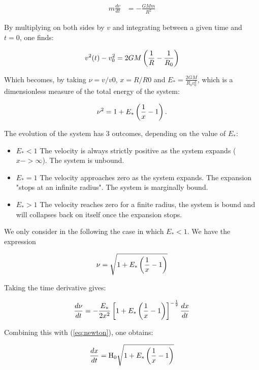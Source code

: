 \begin{align}\label{eq:newton}
m \frac{dv}{dt} & = - \frac{G M m}{R^2}
\end{align}

By multiplying on both sides by $v$ and integrating between a given time and $t=0$, one finds:

\begin{equation}
v^2(t) - v^2_0 = 2GM \left( \frac{1}{R} - \frac{1}{R_0} \right)
\end{equation}

Which becomes, by taking $\nu = v/v0$,  $x= R/R0$ and $E_\ast = \frac{2GM}{R_0 v_0^2}$, which is a dimensionless measure of the total energy of the system:

\begin{equation}
\nu^2  = 1 + E_\ast \left( \frac{1}{x} - 1 \right) .
\end{equation}

The evolution of the system has 3 outcomes, depending on the value of $E_\ast$:
\begin{itemize}
\item $E_\ast<1$ The velocity is always strictly positive as the system expands ($x->\infty$). The system is unbound.
\item $E_\ast=1$ The velocity approaches zero as the system expands. The expansion "stops at an infinite radius". The system is marginally bound.
\item $E_\ast>1$ The velocity reaches zero for a finite radius, the system is bound and will collapses back on itself once the expansion stops. 
\end{itemize}

We only consider in the following the case in which $E_\ast<1$. We have the expression

\begin{equation}
\nu = \sqrt{1+E_\ast\left(\frac{1}{x} - 1\right)}
\end{equation}

Taking the time derivative gives:

\begin{equation}
\frac{d \nu}{dt} = - \frac{E_\ast}{2 x^2} \left[ 1 + E_\ast\left(\frac{1}{x} -1\right)\right]^{-\frac{1}{2}} \frac{dx}{dt}
\end{equation}

Combining this with (\ref{eq:newton}), one obtains:

\begin{equation}
\frac{dx}{dt} = {\textrm{H}}_0 \sqrt{1+ E_\ast\left( \frac{1}{x} -1\right)}
\end{equation}

